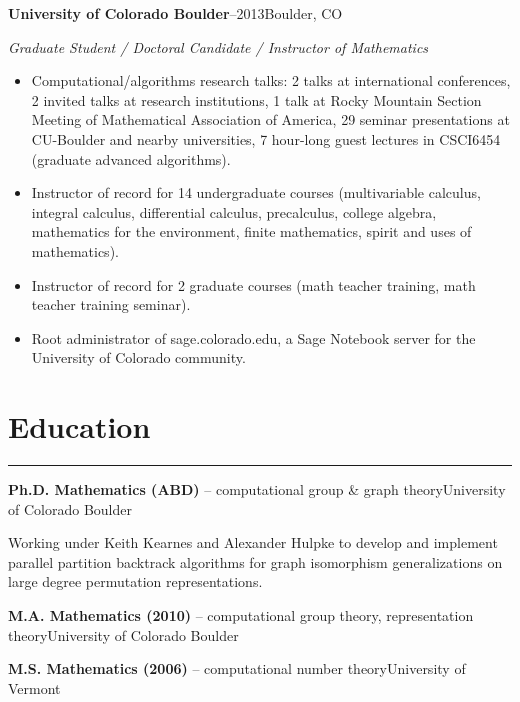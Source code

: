 \documentclass[letterpaper,10pt]{article}
\newcommand{\mblue}{\color{darkblue}}
\begin{document}
\vspace{1pc}
\textbf{University of Colorado Boulder}--2013\hfill Boulder, CO

\bigbreak
\textit{Graduate Student / Doctoral Candidate / Instructor of Mathematics}

\begin{itemize}
\item Computational/algorithms research talks: 2 talks at international conferences, 2 invited talks
at research institutions, 1 talk at Rocky Mountain Section Meeting of Mathematical Association of
America, 29 seminar presentations at CU-Boulder and nearby universities, 7 hour-long guest lectures
in CSCI6454 (graduate advanced algorithms).

\item Instructor of record for 14 undergraduate courses (multivariable calculus,
integral calculus, differential calculus, precalculus, college algebra, mathematics for the
environment, finite mathematics, spirit and uses of mathematics).

\item Instructor of record for 2
graduate courses (math teacher training, math teacher training seminar).

\item Root administrator
of sage.colorado.edu, a Sage Notebook server for the University of Colorado community.
\end{itemize} 


\section*{\mblue Education}

\vspace{-2.15pc}
{\hfill\mblue\rule{5.845in}{0.02cm}}

\vspace{1pc}
\textbf{Ph.D. Mathematics (ABD)} -- computational group \& graph theory\hfill University
of Colorado Boulder

Working under Keith Kearnes and Alexander Hulpke to develop and implement parallel partition
backtrack algorithms for graph isomorphism generalizations on large degree permutation
representations.

\bigbreak \textbf{M.A. Mathematics (2010)} -- computational group theory, representation
theory\hfill University of Colorado Boulder

\bigbreak \textbf{M.S. Mathematics (2006)} -- computational number theory\hfill University of
Vermont
\end{document}
